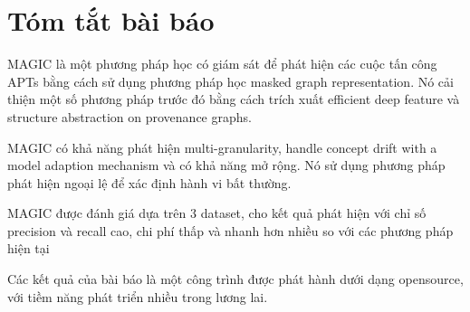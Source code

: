 \section{Tóm tắt bài báo}

MAGIC là một phương pháp học có giám sát để phát hiện các cuộc tấn công APTs bằng cách sử dụng phương pháp học masked graph representation. Nó cải thiện một số phương pháp trước đó bằng cách trích xuất efficient deep feature và structure abstraction on provenance graphs.

MAGIC có khả năng phát hiện multi-granularity, handle concept drift with a model adaption mechanism và có khả năng mở rộng. Nó sử dụng phương pháp phát hiện ngoại lệ để xác định hành vi bất thường.

MAGIC được đánh giá dựa trên 3 dataset, cho kết quả phát hiện với chỉ số precision và recall cao, chi phí thấp và nhanh hơn nhiều so với các phương pháp hiện tại

Các kết quả của bài báo là một công trình được phát hành dưới dạng opensource, với tiềm năng phát triển nhiều trong lương lai.